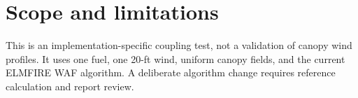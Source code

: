 \section{Scope and limitations}
This is an implementation-specific coupling test, not a validation of canopy wind profiles.  It uses one fuel, one 20-ft wind, uniform canopy fields, and the current ELMFIRE WAF algorithm.  A deliberate algorithm change requires reference calculation and report review.
